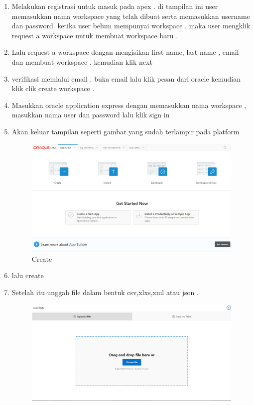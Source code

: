 \begin{enumerate}
    \item Melakukan registrasi untuk masuk pada apex . di tampilan ini user memasukkan nama workspace yang telah dibuat serta memasukkan username dan password. ketika user belum mempunyai workspace . maka user mengklik request a workspace untuk membuat workspace baru .
\newline
    \item   Lalu request a workspace dengan mengisikan first name, last name
    , email dan membuat workspace . kemudian klik next 
\newline
    \item   verifikasi memlalui email . buka email lalu klik pesan dari oracle kemudian klik clik create workspace .
\newline
    \item   Masukkan oracle application express dengan memasukkan nama workspace , masukkan nama user dan password lalu klik sign in
\newline
    \item  Akan keluar tampilan seperti gambar yang sudah terlampir pada platform
    \newline
    \begin{figure} [!htbp]
        \centering
        \includegraphics[scale=0.5]{figures/1.png}
        \caption{Create}
        \label{penanda}
    \end{figure}
\newline
    \item  lalu create
\newline
    \item  Setelah itu unggah file dalam bentuk csv,xlxs,xml atau json .
    \newline
    \begin{figure}[!htbp]
        \centering
        \includegraphics[scale=0.5]{figures/3.png}

\end{figure}
\end{enumerate}
